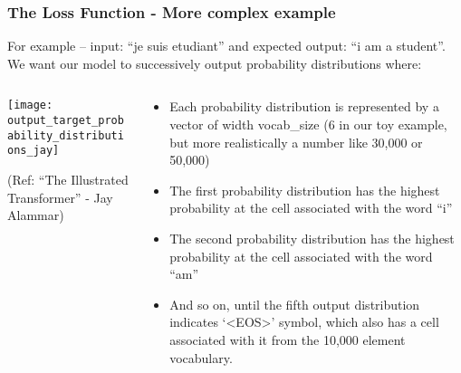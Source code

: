 \begin{frame}[fragile]\frametitle{The Loss Function - More complex example}

For example – input: ``je suis etudiant'' and expected output: ``i am a student''. We want our model to successively output probability distributions where:

\begin{columns}
    \begin{column}[T]{0.5\linewidth}
\begin{center}
\texttt{[image: output\_target\_probability\_distributions\_jay]}


{\tiny (Ref: ``The Illustrated Transformer'' - Jay Alammar)}
\end{center}		

		\end{column}
    \begin{column}[T]{0.5\linewidth}

\begin{itemize}
\item Each probability distribution is represented by a vector of width vocab\_size (6 in our toy example, but more realistically a number like 30,000 or 50,000)
\item The first probability distribution has the highest probability at the cell associated with the word ``i''
\item The second probability distribution has the highest probability at the cell associated with the word ``am''
\item And so on, until the fifth output distribution indicates ‘<EOS>’ symbol, which also has a cell associated with it from the 10,000 element vocabulary.
\end{itemize}
    \end{column}
  \end{columns}	

\end{frame}


